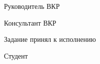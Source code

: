 \intervalS%

Руководитель ВКР \hspace*{0.325\textheight}\Supervisor


\intervalS%

Консультант ВКР \hspace*{0.335\textheight}\ConsultantExtra


\intervalS%


Задание принял к исполнению

\intervalS%

Студент \hspace*{0.41\textheight}\Author



